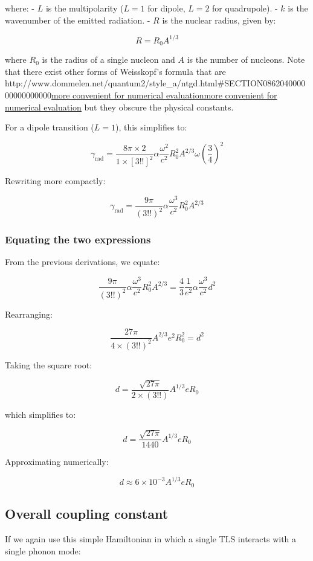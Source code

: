 \documentclass[
]{article}
\let\oldhref\href
\renewcommand{\href}[2]{\ifx#1\urlprefix\oldhref{#1}{#2}\else\uline{\oldhref{#1}{#2}}\fi}
\renewcommand{\[}{\begin{equation}}
\renewcommand{\]}{\end{equation}}
\begin{document}
where: - \(L\) is the multipolarity (\(L=1\) for dipole, \(L=2\) for
quadrupole). - \(k\) is the wavenumber of the emitted radiation. - \(R\)
is the nuclear radius, given by:

\[
R = R_0 A^{1/3}
\]

where \(R_0\) is the radius of a single nucleon and \(A\) is the number
of nucleons. Note that there exist other forms of Weisskopf's formula
that are
\href{http://www.dommelen.net/quantum2/style_a/ntgd.html\#SECTION086204000000000000000}{more
convenient for numerical evaluation} but they obscure the physical
constants.

For a dipole transition (\(L=1\)), this simplifies to:

\[
\gamma_{\text{rad}} = \frac{8\pi \times 2}{1 \times [3!!]^2} \alpha \frac{\omega^2}{c^2} R_0^2 A^{2/3} \omega \left(\frac{3}{4} \right)^2
\]

Rewriting more compactly:

\[
\gamma_{\text{rad}} = \frac{9\pi}{(3!!)^2} \alpha \frac{\omega^3}{c^2} R_0^2 A^{2/3}
\]

\subsubsection{Equating the two
expressions}\label{equating-the-two-expressions}

From the previous derivations, we equate:

\[
\frac{9\pi}{(3!!)^2} \alpha \frac{\omega^3}{c^2} R_0^2 A^{2/3} = \frac{4}{3} \frac{1}{e^2} \alpha \frac{\omega^3}{c^2} d^2
\]

Rearranging:

\[
\frac{27\pi}{4 \times (3!!)^2} A^{2/3} e^2 R_0^2 = d^2
\]

Taking the square root:

\[
d = \frac{\sqrt{27\pi}}{2 \times (3!!)} A^{1/3} e R_0
\]

which simplifies to:

\[
d = \frac{\sqrt{27\pi}}{1440} A^{1/3} e R_0
\]

Approximating numerically:

\[
d \approx 6 \times 10^{-3} A^{1/3} e R_0 \label{eq:d}
\]

\subsection{Overall coupling
constant}\label{overall-coupling-constant-1}

If we again use this simple Hamiltonian in which a single TLS interacts
with a single phonon mode:
\end{document}
